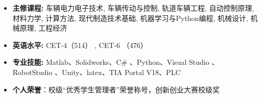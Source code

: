 


\begin{itemize}
    \item \textbf{主修课程:} 车辆电力电子技术, 车辆传动与控制, 轨道车辆工程, 自动控制原理, 材料力学, 计算方法, 现代制造技术基础, 机器学习与Python编程, 机械设计, 机械原理, 工程经济
    \item \textbf{英语水平:} CET-4（514） , CET-6 （476）
    \item \textbf{专业技能:} Matlab、Solidworks、C\# 、Python、Visual Studio 、RobotStudio 、Unity、latex、TIA Portal V18、PLC
   \item \textbf{个人荣誉}：校级“优秀学生管理者”荣誉称号，创新创业大赛校级奖
\end{itemize}







